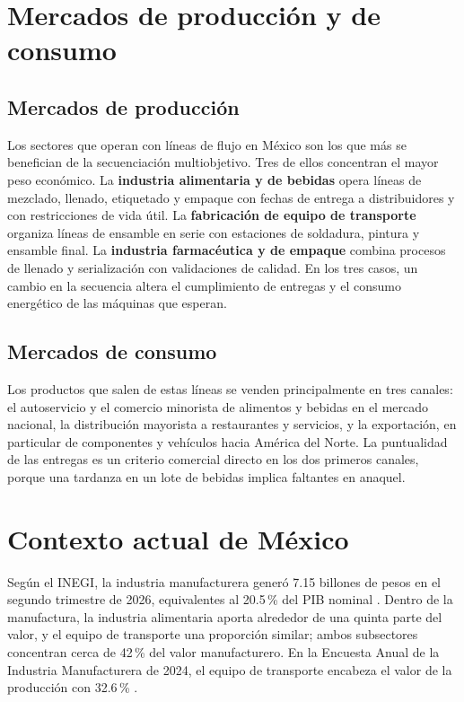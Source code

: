 \documentclass[11pt,a4paper]{article}
\begin{document}
\section{Mercados de producción y de consumo}
\subsection{Mercados de producción}
Los sectores que operan con líneas de flujo en México son los que más se benefician de la secuenciación multiobjetivo. Tres de ellos concentran el mayor peso económico. La \textbf{industria alimentaria y de bebidas} opera líneas de mezclado, llenado, etiquetado y empaque con fechas de entrega a distribuidores y con restricciones de vida útil. La \textbf{fabricación de equipo de transporte} organiza líneas de ensamble en serie con estaciones de soldadura, pintura y ensamble final. La \textbf{industria farmacéutica y de empaque} combina procesos de llenado y serialización con validaciones de calidad. En los tres casos, un cambio en la secuencia altera el cumplimiento de entregas y el consumo energético de las máquinas que esperan.

\subsection{Mercados de consumo}
Los productos que salen de estas líneas se venden principalmente en tres canales: el autoservicio y el comercio minorista de alimentos y bebidas en el mercado nacional, la distribución mayorista a restaurantes y servicios, y la exportación, en particular de componentes y vehículos hacia América del Norte. La puntualidad de las entregas es un criterio comercial directo en los dos primeros canales, porque una tardanza en un lote de bebidas implica faltantes en anaquel.

\section{Contexto actual de México}
Según el INEGI, la industria manufacturera generó 7.15 billones de pesos en el segundo trimestre de 2026, equivalentes al 20.5\,\% del PIB nominal \cite{inegi2026pib}. Dentro de la manufactura, la industria alimentaria aporta alrededor de una quinta parte del valor, y el equipo de transporte una proporción similar; ambos subsectores concentran cerca de 42\,\% del valor manufacturero. En la Encuesta Anual de la Industria Manufacturera de 2024, el equipo de transporte encabeza el valor de la producción con 32.6\,\% \cite{inegi2025eaim}.
\end{document}
